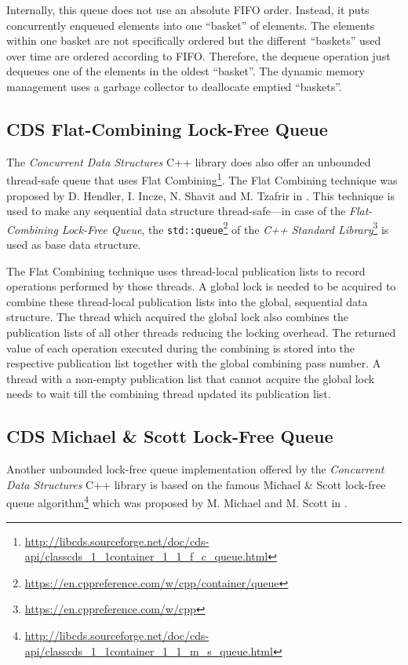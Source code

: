 	Internally, this queue does not use an absolute FIFO order. Instead, it puts concurrently enqueued elements into one ``basket'' of elements. The elements within one basket are not specifically ordered but the different ``baskets'' used over time are ordered according to FIFO. Therefore, the dequeue operation just dequeues one of the elements in the oldest ``basket''. The dynamic memory management uses a garbage collector to deallocate emptied ``baskets''.

\subsection[CDS FCQueue]{CDS Flat-Combining Lock-Free Queue} \label{subsec:cds-fc}

	The \textit{Concurrent Data Structures} C++ library does also offer an unbounded thread-safe queue that uses Flat Combining\footnote{\url{http://libcds.sourceforge.net/doc/cds-api/classcds\_1\_1container\_1\_1\_f\_c\_queue.html}}. The Flat Combining technique was proposed by D. Hendler, I. Incze, N. Shavit and M. Tzafrir in \cite{Hendler:2010}.  This technique is used to make any sequential data structure thread-safe---in case of the \emph{Flat-Combining Lock-Free Queue}, the \lstinline{std::queue}\footnote{\url{https://en.cppreference.com/w/cpp/container/queue}} of the \textit{C++ Standard Library}\footnote{\url{https://en.cppreference.com/w/cpp}} is used as base data structure.
	
	The Flat Combining technique uses thread-local publication lists to record operations performed by those threads. A global lock is needed to be acquired to combine these thread-local publication lists into the global, sequential data structure. The thread which acquired the global lock also combines the publication lists of all other threads reducing the locking overhead. The returned value of each operation executed during the combining is stored into the respective publication list together with the global combining pass number. A thread with a non-empty publication list that cannot acquire the global lock needs to wait till the combining thread updated its publication list.

\subsection[CDS MSQueue]{CDS Michael \& Scott Lock-Free Queue} \label{subsec:cds-ms}

	Another unbounded lock-free queue implementation offered by the \textit{Concurrent Data Structures} C++ library is based on the famous Michael \& Scott lock-free queue algorithm\footnote{\url{http://libcds.sourceforge.net/doc/cds-api/classcds\_1\_1container\_1\_1\_m\_s\_queue.html}} which was proposed by M. Michael and M. Scott in \cite{Michael:1996}.
	
